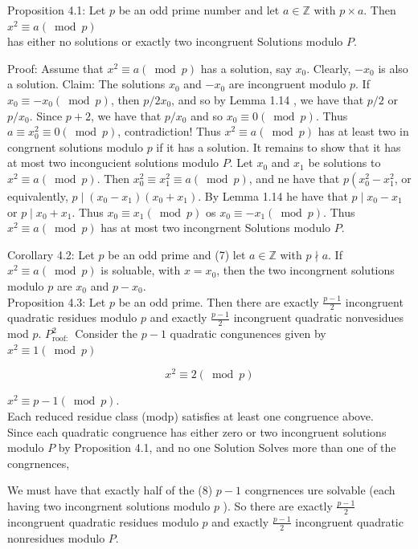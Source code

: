 \documentclass[10pt]{article}
\begin{document}
Proposition 4.1: Let $p$ be an odd prime number and let $a \in \mathbb{Z}$ with $p \times a$. Then $x^{2} \equiv a(\bmod p)$\\
has either no solutions or exactly two incongruent Solutions modulo $P$.

Proof: Assume that $x^{2} \equiv a(\bmod p)$ has a solution, say $x_{0}$. Clearly, $-x_{0}$ is also a solution. Claim: The solutions $x_{0}$ and $-x_{0}$ are incongruent modulo $p$. If $x_{0} \equiv-x_{0}(\bmod p)$, then $p / 2 x_{0}$, and so by Lemma 1.14 , we have that $p / 2$ or $p / x_{0}$. Since $p+2$, we have that $p / x_{0}$ and so $x_{0} \equiv 0(\bmod p)$. Thus $a \equiv x_{0}^{2} \equiv 0(\bmod p)$, contradiction! Thus $x^{2} \equiv a(\bmod p)$ has at least two in congrnent solutions modulo $p$ if it has a solution. It remains to show that it has at most two incongucient solutions modulo $P$. Let $x_{0}$ and $x_{1}$ be solutions to $x^{2} \equiv a(\bmod p)$. Then $x_{0}^{2} \equiv x_{1}^{2} \equiv a(\bmod p)$, and ne have that $p\left(x_{0}^{2}-x_{1}^{2}\right.$, or equivalently, $p \mid\left(x_{0}-x_{1}\right)\left(x_{0}+x_{1}\right)$. By Lemma 1.14 he have that $p \mid x_{0}-x_{1}$ or $p \mid x_{0}+x_{1}$. Thus $x_{0} \equiv x_{1}(\bmod p)$ os $x_{0} \equiv-x_{1}(\bmod p)$. Thus $x^{2} \equiv a(\bmod p)$ has at most two incongrnent Solutions modulo $P$.

Corollary 4.2: Let $p$ be an odd prime and (7) let $a \in \mathbb{Z}$ with $p \nmid a$. If $x^{2} \equiv a(\bmod p)$ is soluable, with $x=x_{0}$, then the two incongrnent solutions modulo $p$ are $x_{0}$ and $p-x_{0}$.\\
Proposition 4.3: Let $p$ be an odd prime. Then there are exactly $\frac{p-1}{2}$ incongruent quadratic residues modulo $p$ and exactly $\frac{p-1}{2}$ incongruent quadratic nonvesidues mod $p$. $P_{\text {roof: }}^{2}$ Consider the $p-1$ quadratic congunences given by $x^{2} \equiv 1(\bmod p)$

$$
x^{2} \equiv 2(\bmod p)
$$

$x^{2} \equiv p-1(\bmod p)$.\\
Each reduced residue class (modp) satisfies at least one congruence above.\\
Since each quadratic congruence has either zero or two incongruent solutions modulo $P$ by Proposition 4.1, and no one Solution Solves more than one of the congrnences,

We must have that exactly half of the (8) $p-1$ congrnences ure solvable (each having two incongrnent solutions modulo $p$ ). So there are exactly $\frac{p-1}{2}$ incongruent quadratic residues modulo $p$ and exactly $\frac{p-1}{2}$ incongruent quadratic nonresidues modulo $P$.
\end{document}
